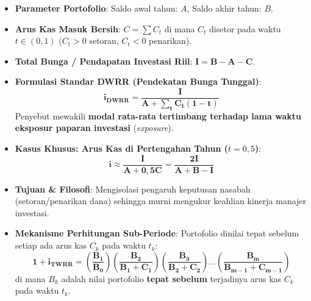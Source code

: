 \documentclass[10pt,a4paper]{article}
\begin{document}
\begin{teoremabox}
\begin{itemize}[leftmargin=1.5em, topsep=1.5pt, itemsep=2pt]
    \item \textbf{Parameter Portofolio}: Saldo awal tahun: $A$, Saldo akhir tahun: $B$.
    \item \textbf{Arus Kas Masuk Bersih}: $C = \sum C_t$ di mana $C_t$ disetor pada waktu $t \in (0, 1)$ ($C_t > 0$ setoran, $C_t < 0$ penarikan).
    \item \textbf{Total Bunga / Pendapatan Investasi Riil}: $\mathbf{I = B - A - C}$.
    \item \textbf{Formulasi Standar DWRR (Pendekatan Bunga Tunggal)}:
    \begin{equation*}
        \mathbf{i_{\text{DWRR}} = \frac{I}{A + \sum_{t} C_t (1 - t)}}
    \end{equation*}
    Penyebut mewakili \textbf{modal rata-rata tertimbang terhadap lama waktu eksposur paparan investasi} (\textit{exposure}).
    \item \textbf{Kasus Khusus: Arus Kas di Pertengahan Tahun ($t = 0{,}5$)}:
    \begin{equation*}
        \mathbf{i \approx \frac{I}{A + 0{,}5 C} = \frac{2I}{A + B - I}}
    \end{equation*}
\end{itemize}
\end{teoremabox}

\begin{teoremabox}
\begin{itemize}[leftmargin=1.5em, topsep=1.5pt, itemsep=2pt]
    \item \textbf{Tujuan \& Filosofi}: Mengisolasi pengaruh keputusan nasabah (setoran/penarikan dana) sehingga murni mengukur keahlian kinerja manajer investasi.
    \item \textbf{Mekanisme Perhitungan Sub-Periode}: Portofolio dinilai tepat sebelum setiap ada arus kas $C_k$ pada waktu $t_k$:
    \begin{equation*}
        \mathbf{1 + i_{\text{TWRR}} = \left( \frac{B_1}{B_0} \right) \left( \frac{B_2}{B_1 + C_1} \right) \left( \frac{B_3}{B_2 + C_2} \right) \dots \left( \frac{B_m}{B_{m-1} + C_{m-1}} \right)}
    \end{equation*}
    di mana $B_k$ adalah nilai portofolio \textbf{tepat sebelum} terjadinya arus kas $C_k$ pada waktu $t_k$.
\end{itemize}
\end{teoremabox}
\end{document}
